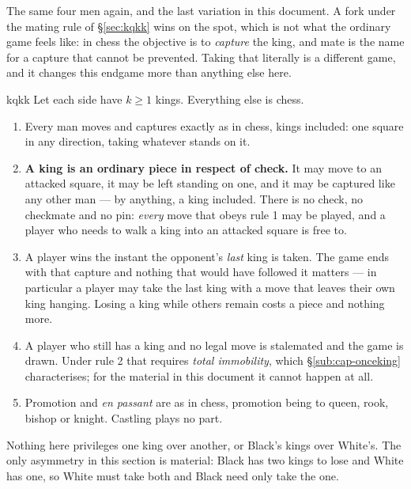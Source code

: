 \documentclass[11pt]{article}
\begin{document}
The same four men again, and the last variation in this document. A fork under
the mating rule of \S\ref{sec:kqkk} wins on the spot, which is not what the ordinary game
feels like: in chess the objective is to \emph{capture} the king, and mate is
the name for a capture that cannot be prevented. Taking that literally is a
different game, and it changes this endgame more than anything else here.

\begin{result}[title={The rules: every king is a man, and you win by taking them all}]{kqkk}
Let each side have $k\ge1$ kings. Everything else is chess.

\smallskip
\begin{enumerate}\setlength{\itemsep}{2pt}
\item Every man moves and captures exactly as in chess, kings included: one
  square in any direction, taking whatever stands on it.
\item \textbf{A king is an ordinary piece in respect of check.} It may move to
  an attacked square, it may be left standing on one, and it may be captured
  like any other man --- by anything, a king included. There is no check, no
  checkmate and no pin: \emph{every} move that obeys rule 1 may be played, and
  a player who needs to walk a king into an attacked square is free to.
\item A player wins the instant the opponent's \emph{last} king is taken. The
  game ends with that capture and nothing that would have followed it matters
  --- in particular a player may take the last king with a move that leaves
  their own king hanging. Losing a king while others remain costs a piece and
  nothing more.
\item A player who still has a king and no legal move is stalemated and the
  game is drawn. Under rule 2 that requires \emph{total immobility}, which
  \S\ref{sub:cap-onceking} characterises; for the material in this document it cannot happen at
  all.
\item Promotion and \emph{en passant} are as in chess, promotion being to
  queen, rook, bishop or knight. Castling plays no part.
\end{enumerate}

\smallskip
Nothing here privileges one king over another, or Black's kings over White's.
The only asymmetry in this section is material: Black has two kings to lose and
White has one, so White must take both and Black need only take the one.
\end{result}
\end{document}
